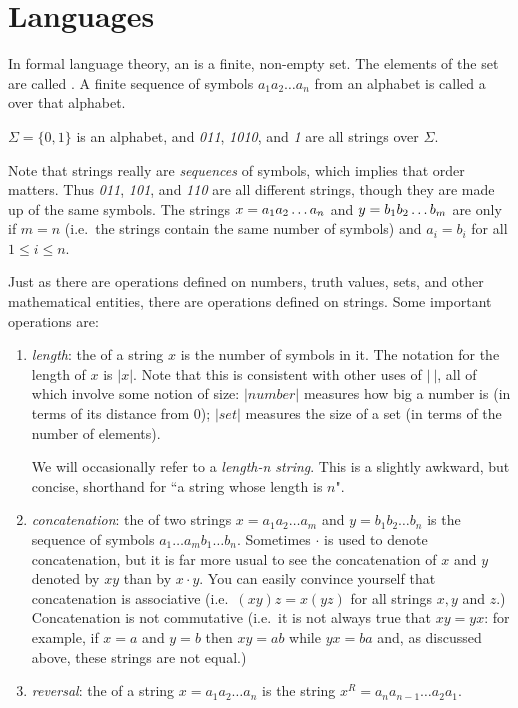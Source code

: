 \section{Languages}
In formal language theory, an  is a finite, non-empty 
set.  The elements of the set are called .  A finite 
sequence of symbols $a_1a_2\ldots a_n$
from an alphabet is called a  over that alphabet.  

\smallskip

\begin{example}
$\Sigma = \{0,1\}$ is an alphabet, and {\em 011}, 
{\em 1010}, and {\em 1} are all strings over $\Sigma$.
\end{example}

\smallskip

Note that strings really are \emph{sequences} of symbols, which 
implies that 
order matters.  Thus {\em 011}, {\em 101}, and {\em 110} are all 
different strings, though they are made up of the same symbols.
The strings $x=\mbox{{${a}_1{a}_2\ldots {a}_{n}$}}$ and $y=\mbox{{${b}_1{b}_2\ldots {b}_{m}$}}$ are  only
if $m=n$ (i.e.\ the strings contain the same number of symbols) and 
$a_i=b_i$ for all
$1 \leq i \leq n$.

Just as there are operations defined on numbers, truth values, sets,
and other mathematical entities, there are operations defined on
strings.  Some important operations are:
\begin{enumerate}
\item {\em length}: the  of a string $x$ is the number of symbols
in it.  The notation for the length of $x$ is $|x|$.  Note that
this is consistent with other uses of $|\ |$, all of which 
involve some notion of size: $|number|$ measures how big a number
is (in terms of its distance from 0);  $|set|$ measures the size
of a set (in terms of the number of elements).

We will occasionally refer to a {\em length-n string}.  This is a
slightly awkward, but concise, shorthand for ``a string whose length
is $n$".

\item {\em concatenation}: the  of two strings $x=a_1
a_2\ldots a_m$ and $y=b_1b_2\ldots b_n$ is the sequence of symbols
$a_1\ldots a_mb_1\ldots b_n$.  Sometimes $\cdot$ is used to denote
concatenation, but it is far more usual to see the concatenation of 
$x$ and $y$ denoted by $xy$ than by $x\cdot y$.  You can easily
convince yourself that concatenation is associative (i.e.\ $(xy)z =
x(yz)$ for all strings $x,y$ and $z$.)  Concatenation is not
commutative (i.e.\ it is not always true that $xy = yx$:
for example, if $x=a$ and $y=b$ then $xy=ab$ while $yx=ba$ and, as
discussed above, these strings are not equal.)

\item {\em reversal}: the  of a string $x=a_1a_2\ldots a_n$ is
the string $x^R = a_na_{n-1}\ldots a_2a_1$.
\end{enumerate}

